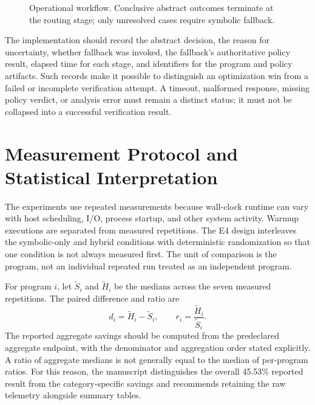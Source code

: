 \begin{figure}[t]
\centering
{}
\caption{Operational workflow. Conclusive abstract outcomes terminate at the routing stage; only unresolved cases require symbolic fallback.}
\label{fig:workflow}
\end{figure}

The implementation should record the abstract decision, the reason for uncertainty, whether fallback was invoked, the fallback's authoritative policy result, elapsed time for each stage, and identifiers for the program and policy artifacts. Such records make it possible to distinguish an optimization win from a failed or incomplete verification attempt. A timeout, malformed response, missing policy verdict, or analysis error must remain a distinct status; it must not be collapsed into a successful verification result.

\section{Measurement Protocol and Statistical Interpretation}
The experiments use repeated measurements because wall-clock runtime can vary with host scheduling, I/O, process startup, and other system activity. Warmup executions are separated from measured repetitions. The E4 design interleaves the symbolic-only and hybrid conditions with deterministic randomization so that one condition is not always measured first. The unit of comparison is the program, not an individual repeated run treated as an independent program.

For program $i$, let $\widetilde{S}_i$ and $\widetilde{H}_i$ be the medians across the seven measured repetitions. The paired difference and ratio are
\[
 d_i=\widetilde{H}_i-\widetilde{S}_i,\qquad
 r_i=\frac{\widetilde{H}_i}{\widetilde{S}_i}.
\]
The reported aggregate savings should be computed from the predeclared aggregate endpoint, with the denominator and aggregation order stated explicitly. A ratio of aggregate medians is not generally equal to the median of per-program ratios. For this reason, the manuscript distinguishes the overall 45.53\% reported result from the category-specific savings and recommends retaining the raw telemetry alongside summary tables.

